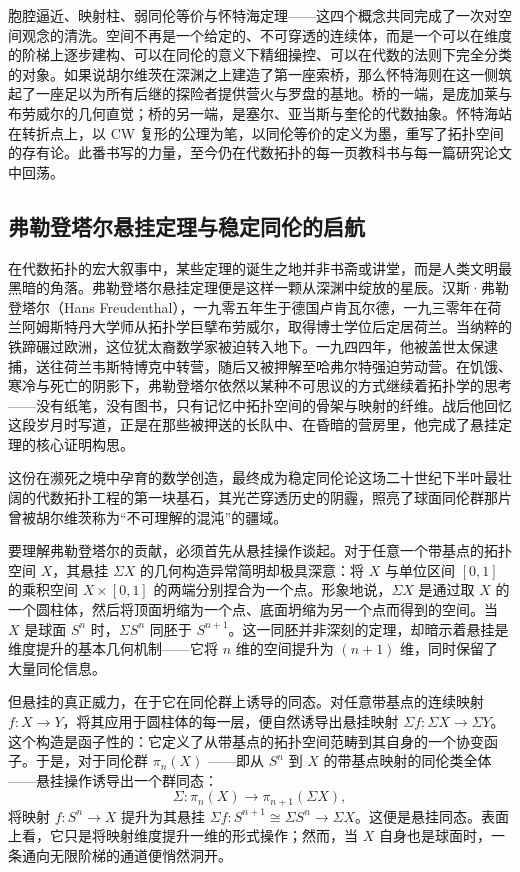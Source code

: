 \documentclass[12pt,a4paper]{article}
\begin{document}
胞腔逼近、映射柱、弱同伦等价与怀特海定理——这四个概念共同完成了一次对空间观念的清洗。空间不再是一个给定的、不可穿透的连续体，而是一个可以在维度的阶梯上逐步建构、可以在同伦的意义下精细操控、可以在代数的法则下完全分类的对象。如果说胡尔维茨在深渊之上建造了第一座索桥，那么怀特海则在这一侧筑起了一座足以为所有后继的探险者提供营火与罗盘的基地。桥的一端，是庞加莱与布劳威尔的几何直觉；桥的另一端，是塞尔、亚当斯与奎伦的代数抽象。怀特海站在转折点上，以 CW 复形的公理为笔，以同伦等价的定义为墨，重写了拓扑空间的存有论。此番书写的力量，至今仍在代数拓扑的每一页教科书与每一篇研究论文中回荡。

\subsection{弗勒登塔尔悬挂定理与稳定同伦的启航}


在代数拓扑的宏大叙事中，某些定理的诞生之地并非书斋或讲堂，而是人类文明最黑暗的角落。弗勒登塔尔悬挂定理便是这样一颗从深渊中绽放的星辰。汉斯·弗勒登塔尔（Hans Freudenthal），一九零五年生于德国卢肯瓦尔德，一九三零年在荷兰阿姆斯特丹大学师从拓扑学巨擘布劳威尔，取得博士学位后定居荷兰。当纳粹的铁蹄碾过欧洲，这位犹太裔数学家被迫转入地下。一九四四年，他被盖世太保逮捕，送往荷兰韦斯特博克中转营，随后又被押解至哈弗尔特强迫劳动营。在饥饿、寒冷与死亡的阴影下，弗勒登塔尔依然以某种不可思议的方式继续着拓扑学的思考——没有纸笔，没有图书，只有记忆中拓扑空间的骨架与映射的纤维。战后他回忆这段岁月时写道，正是在那些被押送的长队中、在昏暗的营房里，他完成了悬挂定理的核心证明构思。

这份在濒死之境中孕育的数学创造，最终成为稳定同伦论这场二十世纪下半叶最壮阔的代数拓扑工程的第一块基石，其光芒穿透历史的阴霾，照亮了球面同伦群那片曾被胡尔维茨称为“不可理解的混沌”的疆域。

要理解弗勒登塔尔的贡献，必须首先从悬挂操作谈起。对于任意一个带基点的拓扑空间 $X$，其悬挂 $\Sigma X$ 的几何构造异常简明却极具深意：将 $X$ 与单位区间 $[0,1]$ 的乘积空间 $X\times [0,1]$ 的两端分别捏合为一个点。形象地说，$\Sigma X$ 是通过取 $X$ 的一个圆柱体，然后将顶面坍缩为一个点、底面坍缩为另一个点而得到的空间。当 $X$ 是球面 $S^n$ 时，$\Sigma S^n$ 同胚于 $S^{n+1}$。这一同胚并非深刻的定理，却暗示着悬挂是维度提升的基本几何机制——它将 $n$ 维的空间提升为 $(n+1)$ 维，同时保留了大量同伦信息。

但悬挂的真正威力，在于它在同伦群上诱导的同态。对任意带基点的连续映射 $f:X\to Y$，将其应用于圆柱体的每一层，便自然诱导出悬挂映射 $\Sigma f:\Sigma X\to \Sigma Y$。这个构造是函子性的：它定义了从带基点的拓扑空间范畴到其自身的一个协变函子。于是，对于同伦群 $\pi_n(X)$ ——即从 $S^n$ 到 $X$ 的带基点映射的同伦类全体——悬挂操作诱导出一个群同态：
$$
\Sigma:\pi_n(X)\longrightarrow\pi_{n+1}(\Sigma X),
$$
将映射 $f:S^n\to X$ 提升为其悬挂 $\Sigma f:S^{n+1}\cong\Sigma S^n\to\Sigma X$。这便是悬挂同态。表面上看，它只是将映射维度提升一维的形式操作；然而，当 $X$ 自身也是球面时，一条通向无限阶梯的通道便悄然洞开。
\end{document}
